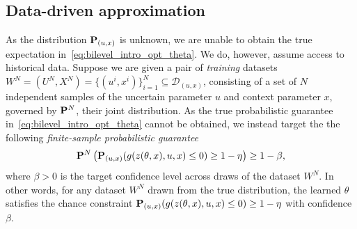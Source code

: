 \documentclass[11pt]{article}
\newcommand{\bsnote}[1]{\noindent\textcolor{red}{\texttt{Bartolomeo: #1}}}
\newcommand{\RC}[1]{\textcolor{black}{#1}}
\begin{document}
\subsection{Data-driven approximation}
\label{ssec:constrained_learning}
As the distribution ${\mathbf P}_{(u,x)}$ is unknown, we are unable to obtain the true expectation in~\eqref{eq:bilevel_intro_opt_theta}. We do, however, assume access to historical data.
Suppose we are given
a pair of {\it training} datasets $W^{N} = (U^N,X^N) = \{(u^i,x^i)\}_{i=1}^N \subseteq \mathcal{D}_{(u,x)}$, consisting of a set of $N$ independent samples of the uncertain parameter $u$ and context parameter $x$, governed by ${\mathbf P}^N$, their joint distribution.
As the true probabilistic guarantee in~\eqref{eq:bilevel_intro_opt_theta} cannot be obtained, we instead target the
the following {\it finite-sample probabilistic guarantee}
\begin{equation}
  \label{eq:prob_guarantee}
  {\mathbf P}^{N}\left({\mathbf P}_{(u,x)}(g(z(\theta,x),u,x) \le 0) \ge 1 - \eta\right)\geq 1 - \beta,
\end{equation}
where $\beta > 0$ is the target confidence level across draws of the dataset $W^N$.
In other words, for any dataset $W^N$ drawn from the true distribution, the learned $\theta$ satisfies the chance constraint ${\mathbf P}_{(u,x)}(g(z(\theta,x),u,x) \le 0) \ge 1 - \eta$ with confidence $\beta$.
\end{document}
